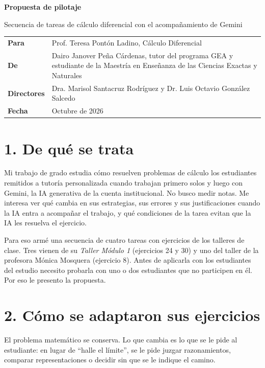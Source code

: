 \documentclass[11pt,letterpaper]{article}
\begin{document}
{\LARGE\bfseries Propuesta de pilotaje\par}
\smallskip
{\large Secuencia de tareas de cálculo diferencial con el acompañamiento de Gemini\par}
\medskip

\noindent\begin{tabularx}{\linewidth}{@{}>{\bfseries}p{2.4cm}L@{}}
Para & Prof. Teresa Pontón Ladino, Cálculo Diferencial \\
De & Dairo Janover Peña Cárdenas, tutor del programa GEA y estudiante de la Maestría en Enseñanza de las Ciencias Exactas y Naturales \\
Directores & Dra. Marisol Santacruz Rodríguez y Dr. Luis Octavio González Salcedo \\
Fecha & Octubre de 2026 \\
\end{tabularx}

\section*{1. De qué se trata}

Mi trabajo de grado estudia cómo resuelven problemas de cálculo los estudiantes remitidos a tutoría personalizada cuando trabajan primero solos y luego con Gemini, la IA generativa de la cuenta institucional. No busco medir notas. Me interesa ver qué cambia en sus estrategias, sus errores y sus justificaciones cuando la IA entra a acompañar el trabajo, y qué condiciones de la tarea evitan que la IA les resuelva el ejercicio.

Para eso armé una secuencia de cuatro tareas con ejercicios de los talleres de clase. Tres vienen de su \emph{Taller Módulo 1} (ejercicios 24 y 30) y uno del taller de la profesora Mónica Mosquera (ejercicio 8). Antes de aplicarla con los estudiantes del estudio necesito probarla con uno o dos estudiantes que no participen en él. Por eso le presento la propuesta.

\section*{2. Cómo se adaptaron sus ejercicios}

El problema matemático se conserva. Lo que cambia es lo que se le pide al estudiante: en lugar de ``halle el límite'', se le pide juzgar razonamientos, comparar representaciones o decidir sin que se le indique el camino.
\end{document}
